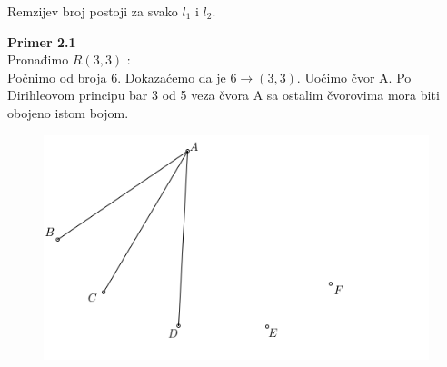 \documentclass[12pt,a4paper]{article}
\begin{document}
	\noindent Remzijev broj postoji za svako $l_1$ i $l_2$.
	
	\vspace{0.7em}
	
	{\noindent\fontsize{12pt}{12pt}\textbf{Primer 2.1}}
	\vspace{0.5em}
	\\	
	Pronađimo $R(3,3)$ :
	\\Počnimo od broja 6. Dokazaćemo da je $6 \rightarrow (3, 3)$. Uočimo čvor A. Po Dirihleovom principu bar 3 od 5 veza čvora A sa ostalim čvorovima mora biti obojeno istom bojom. 
	\begin{figure}[h]
	\centering
	\includegraphics[scale=2.3]{r33.png}
	\end{figure}
	
\end{document}
